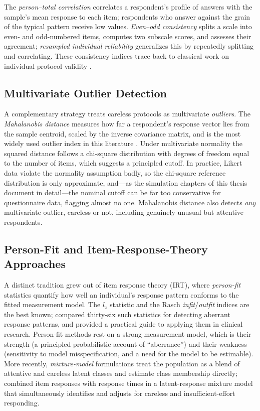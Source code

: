 \documentclass[doc,11pt,donotrepeattitle]{apa7}
\begin{document}
The \emph{person--total correlation} correlates a respondent's profile of
answers with the sample's mean response to each item; respondents who answer
against the grain of the typical pattern receive low values. \emph{Even--odd
consistency} splits a scale into even- and odd-numbered items, computes two
subscale scores, and assesses their agreement; \emph{resampled individual
reliability} generalizes this by repeatedly splitting and correlating. These
consistency indices trace back to classical work on individual-protocol
validity \parencite{jackson1976jackson, johnson2005ascertaining}.

\subsection{Multivariate Outlier Detection}

A complementary strategy treats careless protocols as multivariate
\emph{outliers}. The \emph{Mahalanobis distance} \parencite{mahalanobis1936generalised}
measures how far a respondent's response vector lies from the sample centroid,
scaled by the inverse covariance matrix, and is the most widely used outlier
index in this literature \parencite{meade2012identifying, curran2016methods}.
Under multivariate normality the squared distance follows a chi-square
distribution with degrees of freedom equal to the number of items, which
suggests a principled cutoff. In practice, Likert data violate the normality
assumption badly, so the chi-square reference distribution is only approximate,
and---as the simulation chapters of this thesis document in detail---the
nominal cutoff can be far too conservative for questionnaire data, flagging
almost no one. Mahalanobis distance also detects \emph{any} multivariate
outlier, careless or not, including genuinely unusual but attentive respondents.

\subsection{Person-Fit and Item-Response-Theory Approaches}

A distinct tradition grew out of item response theory (IRT), where
\emph{person-fit} statistics quantify how well an individual's response pattern
conforms to the fitted measurement model. The $l_z$ statistic and the Rasch
\emph{infit}/\emph{outfit} indices are the best known; \textcite{karabatsos2003comparing}
compared thirty-six such statistics for detecting aberrant response patterns,
and \textcite{meijer2016practical} provided a practical guide to applying them
in clinical research. Person-fit methods rest on a strong measurement model,
which is their strength (a principled probabilistic account of ``aberrance'')
and their weakness (sensitivity to model misspecification, and a need for the
model to be estimable). More recently, \emph{mixture-model} formulations treat
the population as a blend of attentive and careless latent classes and estimate
class membership directly; \textcite{ulitzsch2022response} combined item
responses with response times in a latent-response mixture model that
simultaneously identifies and adjusts for careless and insufficient-effort
responding.
\end{document}
